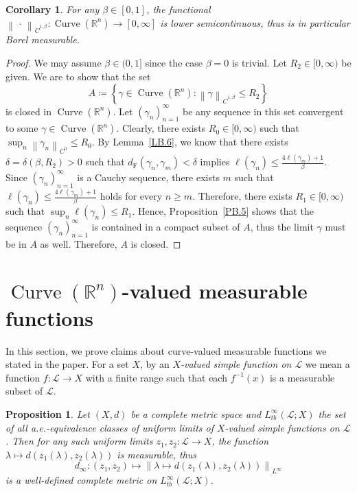 \documentclass[reqno,centertags,12pt]{amsart}
\newtheorem{proposition}[theorem]{Proposition}
\newtheorem{corollary}[theorem]{Corollary}
\theoremstyle{definition}
\numberwithin{equation}{section}
\newcommand{\norm}[1]{\left\|#1\right\|}
\newcommand{\setbc}[2]{\left\{ #1\colon#2 \right\}}
\newcommand{\seq}[1]{\left( #1 \right)}
\newcommand{\bbR}{{\mathbb{R}}}
\begin{document}
\begin{corollary}\label{CB.7}
    For any $\beta\in[0,1]$, the functional $\norm{\,\cdot\,}_{\dot{C}^{1,\beta}}\colon
    \operatorname{Curve}(\bbR^{n})\to[0,\infty]$ is lower semicontinuous,
    thus is in particular Borel measurable.
\end{corollary}

\begin{proof}
    We may assume $\beta\in(0,1]$ since the case $\beta=0$ is trivial.
    Let $R_{2}\in[0,\infty)$ be given. We are to show that the set
    \[
        A\coloneqq\setbc{\gamma\in\operatorname{Curve}(\bbR^{n})}
        {\norm{\gamma}_{\dot{C}^{1,\beta}} \leq R_{2}}   
    \]
    is closed in $\operatorname{Curve}(\bbR^{n})$. Let $\seq{\gamma_{n}}_{n=1}^{\infty}$
    be any sequence in this set convergent to some $\gamma\in\operatorname{Curve}(\bbR^{n})$.
    Clearly, there exists $R_{0}\in[0,\infty)$ such that
    $\sup_{n}\norm{\gamma_{n}}_{C^{0}} \leq R_{0}$.
    By Lemma~\ref{LB.6}, we know that
    there exists $\delta=\delta(\beta,R_{2})>0$ such that
    $d_{\mathrm{F}}(\gamma_{n},\gamma_{m})<\delta$
    implies $\ell(\gamma_{n}) \leq \frac{4\ell(\gamma_{m}) + 1}{\beta}$.
    Since $\seq{\gamma_{n}}_{n=1}^{\infty}$ is a Cauchy sequence,
    there exists $m$ such that $\ell(\gamma_{n}) \leq \frac{4\ell(\gamma_{m}) + 1}{\beta}$
    holds for every $n\geq m$. Therefore, there exists $R_{1}\in[0,\infty)$
    such that $\sup_{n}\ell(\gamma_{n}) \leq R_{1}$.
    Hence, Proposition~\ref{PB.5} shows that
    the sequence $\seq{\gamma_{n}}_{n=1}^{\infty}$ is contained in a
    compact subset of $A$, thus the limit $\gamma$ must be in $A$ as well.
    Therefore, $A$ is closed.
\end{proof}


\section{$\operatorname{Curve}(\bbR^{n})$-valued measurable functions} \label{SC}

In this section, we prove claims about curve-valued measurable functions
we stated in the paper. For a set $X$, by an \emph{$X$-valued simple function on $\mathcal{L}$}
we mean a function $f\colon\mathcal{L}\to X$ with a finite range such that each
$f^{-1}(x)$ is a measurable subset of $\mathcal{L}$.

\begin{proposition}\label{PC.1}
    Let $(X,d)$ be a complete metric space and $L_{tb}^{\infty}(\mathcal{L};X)$ the set of
    all a.e.-equivalence classes of uniform limits of
    $X$-valued simple functions on $\mathcal{L}$. Then for any such uniform limits
    $z_{1},z_{2}\colon\mathcal{L}\to X$, the function
    $\lambda\mapsto d(z_{1}(\lambda),z_{2}(\lambda))$ is measurable, thus
    \[
        d_{\infty}\colon (z_{1},z_{2})\mapsto
        \norm{\lambda\mapsto d(z_{1}(\lambda),z_{2}(\lambda))}_{L^{\infty}}
    \]
    is a well-defined complete metric on $L_{tb}^{\infty}(\mathcal{L};X)$.
\end{proposition}
\end{document}
